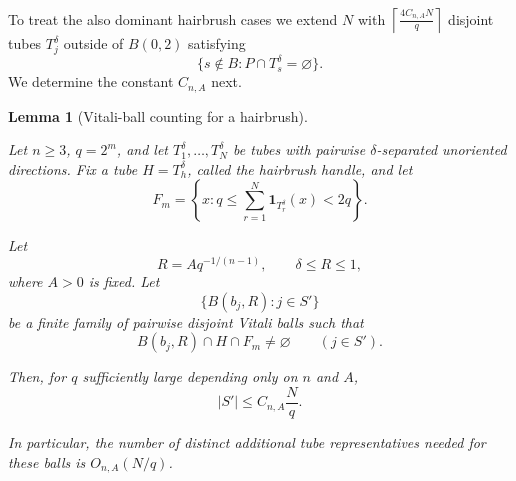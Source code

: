 \documentclass[11pt, letterpaper]{nyjm}
\newtheorem{lemma}[theorem]{Lemma}
\begin{document}
To treat the also dominant hairbrush cases we extend
$N$ with $\left \lceil \frac{4C_{n,A}N}{q} \right \rceil$  disjoint tubes $T_j^{\delta}$ outside of $B(0,2)$ satisfying 
\[
\{s\notin B:P\cap T_s^\delta=\varnothing\}. \]  
We determine the constant $C_{n,A}$ next.
\begin{lemma}[Vitali-ball counting for a hairbrush]
	\label{lem:hairbrush-vitali}
	
	Let $n\geq 3$, $q=2^m$, and let
	$T_1^\delta,\ldots,T_N^\delta$ be tubes with
	pairwise $\delta$-separated unoriented directions.
	Fix a tube $H=T_h^\delta$, called the hairbrush
	handle, and let
	\[
	F_m=\left\{x:
	q\leq\sum_{r=1}^N\mathbf 1_{T_r^\delta}(x)<2q
	\right\}.
	\]
	
	Let
	\[
	R=Aq^{-1/(n-1)},\qquad \delta\leq R\leq 1,
	\]
	where $A>0$ is fixed. Let
	\[
	\{B(b_j,R):j\in S'\}
	\]
	be a finite family of pairwise disjoint Vitali
	balls such that
	\[
	B(b_j,R)\cap H\cap F_m\neq\varnothing
	\qquad(j\in S').
	\]
	
	Then, for $q$ sufficiently large depending only
	on $n$ and $A$,
	\[
	\boxed{|S'|\leq C_{n,A}\frac{N}{q}.}
	\]
	
	In particular, the number of distinct additional
	tube representatives needed for these balls is
	$O_{n,A}(N/q)$.
	
\end{lemma}
\end{document}
